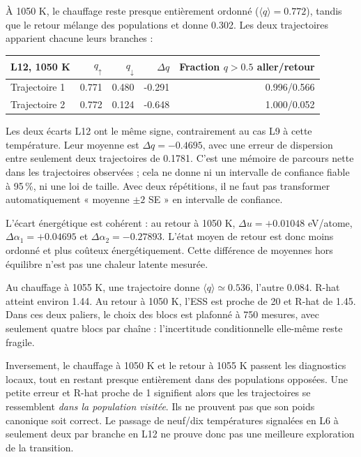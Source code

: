 À 1050 K, le chauffage reste presque entièrement ordonné ($\langle q\rangle=0.772$), tandis que le retour mélange des populations et donne 0.302. Les deux trajectoires apparient chacune leurs branches :

\begin{center}\small\begin{tabular}{lrrrr}\toprule

L12, 1050 K & $q_\uparrow$ & $q_\downarrow$ & $\Delta q$ & Fraction $q>0.5$ aller/retour\\\midrule

Trajectoire 1 & 0.771 & 0.480 & -0.291 & 0.996/0.566\\

Trajectoire 2 & 0.772 & 0.124 & -0.648 & 1.000/0.052\\

\bottomrule\end{tabular}\end{center}

Les deux écarts L12 ont le même signe, contrairement au cas L9 à cette température. Leur moyenne est $\Delta q=-0.4695$, avec une erreur de dispersion entre seulement deux trajectoires de 0.1781. C’est une mémoire de parcours nette dans les trajectoires observées ; cela ne donne ni un intervalle de confiance fiable à 95\,\%, ni une loi de taille. Avec deux répétitions, il ne faut pas transformer automatiquement « moyenne $\pm2$ SE » en intervalle de confiance.

L’écart énergétique est cohérent : au retour à 1050 K, $\Delta u=+0.01048$ eV/atome, $\Delta\alpha_1=+0.04695$ et $\Delta\alpha_2=-0.27893$. L’état moyen de retour est donc moins ordonné et plus coûteux énergétiquement. Cette différence de moyennes hors équilibre n’est pas une chaleur latente mesurée.


Au chauffage à 1055 K, une trajectoire donne $\langle q\rangle\simeq0.536$, l’autre 0.084. R-hat atteint environ 1.44. Au retour à 1050 K, l’ESS est proche de 20 et R-hat de 1.45. Dans ces deux paliers, le choix des blocs est plafonné à 750 mesures, avec seulement quatre blocs par chaîne : l’incertitude conditionnelle elle-même reste fragile.

Inversement, le chauffage à 1050 K et le retour à 1055 K passent les diagnostics locaux, tout en restant presque entièrement dans des populations opposées. Une petite erreur et R-hat proche de 1 signifient alors que les trajectoires se ressemblent \emph{dans la population visitée}. Ils ne prouvent pas que son poids canonique soit correct. Le passage de neuf/dix températures signalées en L6 à seulement deux par branche en L12 ne prouve donc pas une meilleure exploration de la transition.

